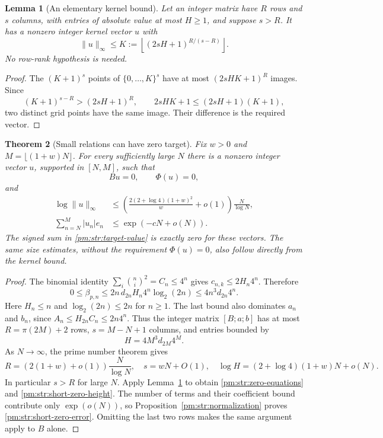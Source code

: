 \documentclass[11pt,a4paper]{article}
\newtheorem{theorem}{Theorem}[section]
\newtheorem{lemma}[theorem]{Lemma}
\theoremstyle{definition}
\theoremstyle{remark}
\numberwithin{equation}{section}
\begin{document}
\begin{lemma}[An elementary kernel bound]\label{pm:str:pigeonhole}
Let an integer matrix have $R$ rows and $s$ columns, with entries of
absolute value at most $H\geq1$, and suppose $s>R$.  It has a nonzero
integer kernel vector $u$ with
\begin{equation}\label{pm:str:kernel-K}
 \|u\|_\infty\leq
 K:=\left\lfloor(2sH+1)^{R/(s-R)}\right\rfloor.
\end{equation}
No row-rank hypothesis is needed.
\end{lemma}

\begin{proof}
The $(K+1)^s$ points of $\{0,\ldots,K\}^s$ have at most
$(2sHK+1)^R$ images.  Since
\[
 (K+1)^{s-R}>(2sH+1)^R,
 \qquad 2sHK+1\leq(2sH+1)(K+1),
\]
two distinct grid points have the same image.  Their difference is
the required vector.
\end{proof}

\begin{theorem}[Small relations can have zero target]\label{pm:str:small-zero}
Fix $w>0$ and $M=\lfloor(1+w)N\rfloor$.  For every sufficiently
large $N$ there is a nonzero integer vector $u$, supported in $[N,M]$,
such that
\begin{equation}\label{pm:str:zero-equations}
 Bu=0,\qquad \Phi(u)=0,
\end{equation}
and
\begin{align}
 \log\|u\|_\infty
 &\leq\left(\frac{2(2+\log4)(1+w)^2}{w}+o(1)\right)
                 \frac{N}{\log N},\label{pm:str:short-zero-height}\\
 \sum_{n=N}^M|u_n|e_n
 &\leq\exp(-cN+o(N)).\label{pm:str:short-zero-error}
\end{align}
The signed sum in \eqref{pm:str:target-value} is exactly zero for these
vectors.  The same size estimates, without the requirement
$\Phi(u)=0$, also follow directly from the kernel bound.
\end{theorem}

\begin{proof}
The binomial identity $\sum_i\binom ni^2=C_n\leq4^n$ gives
$c_{n,k}\leq2H_n4^n$.  Therefore
\[
 0\leq\beta_{p,n}\leq
 2n\,d_{2n}H_n4^n\log_2(2n)
 \leq4n^3d_{2n}4^n.
\]
Here $H_n\leq n$ and $\log_2(2n)\leq2n$ for $n\geq1$.
The last bound also dominates $a_n$ and $b_n$, since
$A_n\leq H_{2n}C_n\leq2n4^n$.  Thus the integer matrix $[B;a;b]$
has at most $R=\pi(2M)+2$ rows, $s=M-N+1$ columns, and entries
bounded by
\[
 H=4M^3d_{2M}4^M.
\]
As $N\to\infty$, the prime number theorem gives
\[
 R=\left(2(1+w)+o(1)\right)\frac{N}{\log N},\quad
 s=wN+O(1),\quad
 \log H=(2+\log4)(1+w)N+o(N).
\]
In particular $s>R$ for large $N$.  Apply
Lemma~\ref{pm:str:pigeonhole} to obtain \eqref{pm:str:zero-equations} and
\eqref{pm:str:short-zero-height}.  The number of terms and their
coefficient bound contribute only $\exp(o(N))$, so
Proposition~\ref{pm:str:normalization} proves
\eqref{pm:str:short-zero-error}.  Omitting the last two rows makes the
same argument apply to $B$ alone.
\end{proof}
\end{document}

